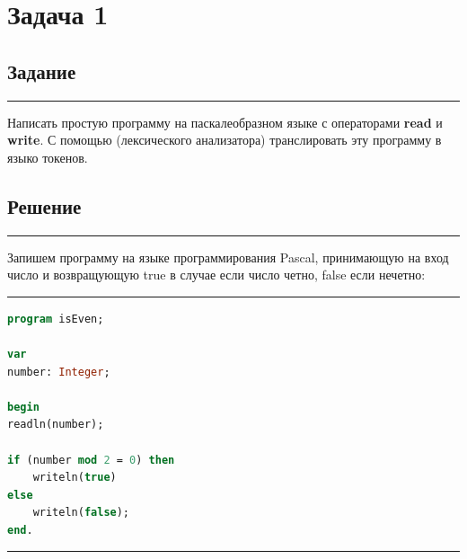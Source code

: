 \documentclass[a4paper, 14pt]{extarticle}
\begin{document}
\section*{Задача 1}

\subsection*{Задание}\vspace{-20pt}\rule{\linewidth}{0.1mm}

Написать простую программу на паскалеобразном языке с операторами 
\textbf{read} и \textbf{write}. С помощью (лексического анализатора) транслировать 
эту программу в языко токенов.

\subsection*{Решение}\vspace{-20pt}\rule{\linewidth}{0.1mm}

Запишем программу на языке программирования Pascal, принимающую на вход число и 
возвращующую true в случае если число четно, false если нечетно:\\

\vspace{50pt}


\vspace{-10pt}\rule{\linewidth}{0.1mm}

\begin{adjustbox}{center}
    \begin{adjustbox}{width=0.4\textwidth}
        \begin{lstlisting}[language=Pascal]
program isEven;

var
number: Integer;

begin
readln(number);

if (number mod 2 = 0) then
    writeln(true)
else
    writeln(false);
end.
        \end{lstlisting}
    \end{adjustbox}
\end{adjustbox}

\vspace{10pt}\rule{\linewidth}{0.1mm}

\newpage
\end{document}
